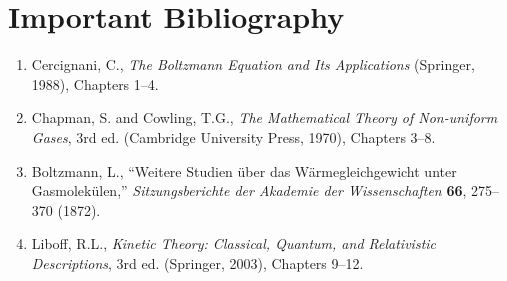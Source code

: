 \section*{Important Bibliography}
\begin{enumerate}
\item Cercignani, C., \textit{The Boltzmann Equation and Its Applications} (Springer, 1988), Chapters 1--4.
\item Chapman, S. and Cowling, T.G., \textit{The Mathematical Theory of Non-uniform Gases}, 3rd ed. (Cambridge University Press, 1970), Chapters 3--8.
\item Boltzmann, L., ``Weitere Studien über das Wärmegleichgewicht unter Gasmolekülen,'' \textit{Sitzungsberichte der Akademie der Wissenschaften} \textbf{66}, 275--370 (1872).
\item Liboff, R.L., \textit{Kinetic Theory: Classical, Quantum, and Relativistic Descriptions}, 3rd ed. (Springer, 2003), Chapters 9--12.
\end{enumerate}

